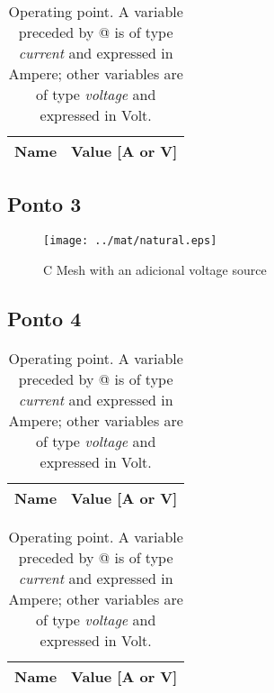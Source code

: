 \begin{table}[h]
  \centering
  \begin{tabular}{|l|r|}
    \hline    
    {\bf Name} & {\bf Value [A or V]} \\ \hline
    
  \end{tabular}
  \caption{Operating point. A variable preceded by @ is of type {\em current}
    and expressed in Ampere; other variables are of type {\it voltage} and expressed in
    Volt.}
  \label{tab:mat2b}
\end{table}

\subsection{Ponto 3}

\begin{figure}[h] \centering
\texttt{[image: ../mat/natural.eps]}
\caption{C Mesh with an adicional voltage source} %
\label{fig:mat3}
\end{figure}

\subsection{Ponto 4}

\begin{table}[h]
  \centering
  \begin{tabular}{|l|r|}
    \hline    
    {\bf Name} & {\bf Value [A or V]} \\ \hline
    
  \end{tabular}
  \caption{Operating point. A variable preceded by @ is of type {\em current}
    and expressed in Ampere; other variables are of type {\it voltage} and expressed in
    Volt.}
  \label{tab:mat4}
\end{table}

\begin{table}[h]
  \centering
  \begin{tabular}{|l|r|}
    \hline    
    {\bf Name} & {\bf Value [A or V]} \\ \hline
    
  \end{tabular}
  \caption{Operating point. A variable preceded by @ is of type {\em current}
    and expressed in Ampere; other variables are of type {\it voltage} and expressed in
    Volt.}
  \label{tab:mat4a}
\end{table}



